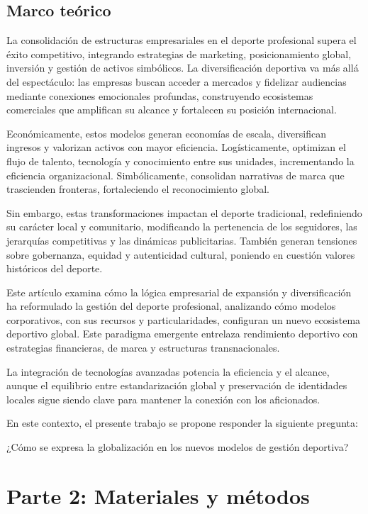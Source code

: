 \documentclass[12pt,a4paper]{article}
\begin{document}
\subsection{Marco teórico}

La consolidación de estructuras empresariales en el deporte profesional supera el éxito competitivo, integrando estrategias de marketing, posicionamiento global, inversión y gestión de activos simbólicos. La diversificación deportiva va más allá del espectáculo: las empresas buscan acceder a mercados y fidelizar audiencias mediante conexiones emocionales profundas, construyendo ecosistemas comerciales que amplifican su alcance y fortalecen su posición internacional.

Económicamente, estos modelos generan economías de escala, diversifican ingresos y valorizan activos con mayor eficiencia. Logísticamente, optimizan el flujo de talento, tecnología y conocimiento entre sus unidades, incrementando la eficiencia organizacional. Simbólicamente, consolidan narrativas de marca que trascienden fronteras, fortaleciendo el reconocimiento global.

Sin embargo, estas transformaciones impactan el deporte tradicional, redefiniendo su carácter local y comunitario, modificando la pertenencia de los seguidores, las jerarquías competitivas y las dinámicas publicitarias. También generan tensiones sobre gobernanza, equidad y autenticidad cultural, poniendo en cuestión valores históricos del deporte.

Este artículo examina cómo la lógica empresarial de expansión y diversificación ha reformulado la gestión del deporte profesional, analizando cómo modelos corporativos, con sus recursos y particularidades, configuran un nuevo ecosistema deportivo global. Este paradigma emergente entrelaza rendimiento deportivo con estrategias financieras, de marca y estructuras transnacionales.

La integración de tecnologías avanzadas potencia la eficiencia y el alcance, aunque el equilibrio entre estandarización global y preservación de identidades locales sigue siendo clave para mantener la conexión con los aficionados.

En este contexto, el presente trabajo se propone responder la siguiente pregunta:

¿Cómo se expresa la globalización en los nuevos modelos de gestión deportiva?


\section{Parte 2: Materiales y métodos}
\end{document}
